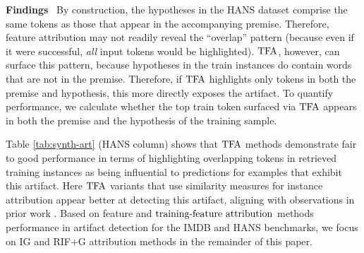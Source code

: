 \documentclass[11pt]{article}
\newcommand\para[1]{\vskip 1mm\noindent\textbf{#1}~}
\begin{document}
\para{Findings} By construction, the hypotheses in the HANS dataset comprise the same tokens as those that appear in the accompanying premise. 
Therefore, feature attribution may not readily reveal the ``overlap'' pattern (because even if it were successful, \emph{all} input tokens would be highlighted).
$\text{TFA}$, however, can surface this pattern, because hypotheses in the train instances do contain words that are not in the premise. 
Therefore, if $\text{TFA}$ highlights %
only tokens in both the premise and hypothesis, this more directly exposes the artifact. %
To quantify performance, we calculate whether the top train token surfaced via $\text{TFA}$ appears in both the premise and the hypothesis of the training sample. 

Table \ref{tab:synth-art} (HANS column) shows that $\text{TFA}$ methods demonstrate fair to good performance in terms of highlighting overlapping tokens in retrieved training instances as being influential to predictions for examples that exhibit this artifact. %
Here $\text{TFA}$ variants that use similarity measures for instance attribution appear better at detecting this artifact, aligning with observations in prior work \cite{pezeshkpour2021empirical}. 
Based on feature and $\text{training-feature attribution}$ methods performance in artifact detection for the IMDB and HANS benchmarks, we focus on IG and RIF+G attribution methods in the remainder of this paper.


\end{document}
